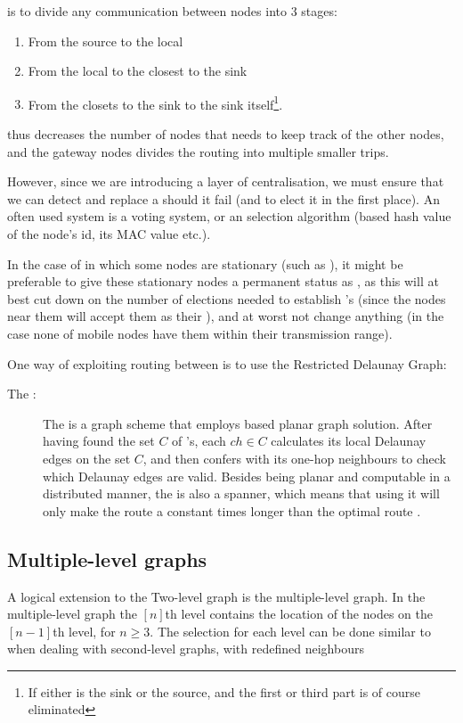 \ch is to divide any communication between nodes into 3 stages:
\begin{enumerate}
\item From the source to the local \ch 
\item From the local \ch to the \ch closest to the sink
\item From the \ch closets to the sink to the sink itself\footnote{If either \ch is the sink or the source, and the first or third part is of course eliminated}.
\end{enumerate}
 \ch thus decreases the number of nodes that needs to keep track of the other nodes, and the gateway nodes divides the routing into multiple smaller trips.  

However, since we are introducing a layer of centralisation, we must ensure that we can detect and replace a \ch should it fail (and to elect it in the first place). An often used system is a voting system, or an selection algorithm (based hash value of the node's id, its MAC value etc.).

In the case of \manet in which some nodes are stationary (such as \cite{two-tier}), it might be preferable to give these stationary nodes a permanent status as \ch, as this will at best cut down on the number of elections needed to establish \ch's (since the nodes near them will accept them as their \ch), and at worst not change anything (in the case none of mobile nodes have them within their transmission range).

One way of exploiting routing between \ch is to use the Restricted Delaunay Graph:
\begin{description}
\item[The \rdg:] The \rdg is a graph scheme that employs \ch based planar graph solution. After having found the set $C$ of \ch's, each $ch \in C$ calculates its local Delaunay edges on the set $C$, and then confers with its one-hop \ch neighbours to check which Delaunay edges are valid. Besides being planar and computable in a distributed manner, the \rdg is also a spanner, which means that using it will only make the route a constant times longer than the optimal route \cite{GeoSpanners}.
\end{description}

\subsection{Multiple-level graphs}
A logical extension to the Two-level graph is the multiple-level graph. In the multiple-level graph the $[n]$th level contains the location of the nodes on the $[n-1]$th level, for $n \geq 3$. The selection for each level can be done similar to when dealing with second-level graphs, with redefined neighbours    
